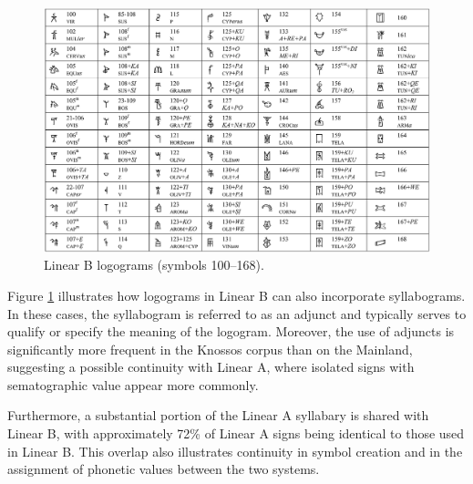 \begin{figure}[H]
    \centering
    \includegraphics[width=1\textwidth]{Images/logos_1.jpg}
    \caption{Linear B logograms (symbols 100–168).}
    \label{fig:logos_1}
\end{figure}

Figure \ref{fig:logos_1} illustrates how logograms in Linear B can also incorporate syllabograms.
In these cases, the syllabogram is referred to as an adjunct and typically serves to qualify or specify the meaning of the logogram.
Moreover, the use of adjuncts is significantly more frequent in the Knossos corpus than on the Mainland, suggesting a possible continuity with Linear A, where isolated signs with sematographic value appear more commonly. \cite{salg-ch3}

Furthermore, a substantial portion of the Linear A syllabary is shared with Linear B, with approximately 72\% of Linear A signs being identical to those used in Linear B.
This overlap also illustrates continuity in symbol creation and in the assignment of phonetic values between the two systems.

